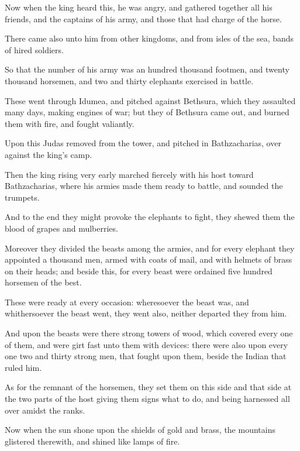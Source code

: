 {\par }{\PP {}Now when the king heard this, he was angry, and gathered together all his friends, and the captains of his army, and those that had charge of the horse.
\par }{\PP {}There came also unto him from other kingdoms, and from isles of the sea, bands of hired soldiers.
\par }{\PP {}So that the number of his army was an hundred thousand footmen, and twenty thousand horsemen, and two and thirty elephants exercised in battle.
\par }{\PP {}These went through Idumea, and pitched against Bethsura, which they assaulted many days, making engines of war; but they of Bethsura came out, and burned them with fire, and fought valiantly.
\par }{\PP {}Upon this Judas removed from the tower, and pitched in Bathzacharias, over against the king’s camp.
\par }{\PP {}Then the king rising very early marched fiercely with his host toward Bathzacharias, where his armies made them ready to battle, and sounded the trumpets.
\par }{\PP {}And to the end they might provoke the elephants to fight, they shewed them the blood of grapes and mulberries.
\par }{\PP {}Moreover they divided the beasts among the armies, and for every elephant they appointed a thousand men, armed with coats of mail, and with helmets of brass on their heads; and beside this, for every beast were ordained five hundred horsemen of the best.
\par }{\PP {}These were ready at every occasion: wheresoever the beast was, and whithersoever the beast went, they went also, neither departed they from him.
\par }{\PP {}And upon the beasts were there strong towers of wood, which covered every one of them, and were girt fast unto them with devices: there were also upon every one two and thirty strong men, that fought upon them, beside the Indian that ruled him.
\par }{\PP {}As for the remnant of the horsemen, they set them on this side and that side at the two parts of the host giving them signs what to do, and being harnessed all over amidst the ranks.
\par }{\PP {}Now when the sun shone upon the shields of gold and brass, the mountains glistered therewith, and shined like lamps of fire.
}
